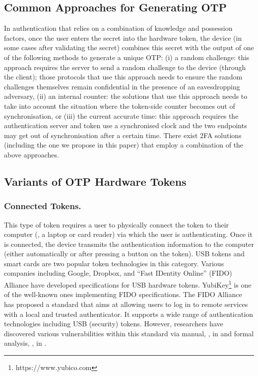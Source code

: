 \subsection{Common Approaches for Generating OTP}

In authentication that relies on a combination of knowledge and possession factors, once the user enters the secret into the hardware token, the device (in some cases after validating the secret) combines this secret with the output of one of the following methods to generate a unique OTP:  (i) a random challenge: this approach requires the server to send a random challenge to the device (through the client); those protocols that use this approach needs to ensure the random challenges themselves remain confidential in the presence of an eavesdropping adversary,  (ii) an internal counter:  the solutions that use this approach needs to take into account the situation where the token-side counter becomes out of synchronisation, or (iii) the current accurate time: this approach requires the authentication server and token use a synchronised clock and the two endpoints may get out of synchronisation after a certain time. There exist 2FA solutions (including the one we propose in this paper) that employ a combination of the above approaches. 
\subsection{Variants of OTP Hardware Tokens}

\subsubsection{Connected Tokens.}
This type of token requires a user to physically connect the token to their computer (\eg, a laptop or card reader) via which the user is authenticating. Once it is connected, the device transmits the authentication information to the computer (either automatically or after pressing a button on the token). USB tokens and smart cards are two popular token technologies in this category.  Various companies including Google, Dropbox, and  ``Fast IDentity Online'' (FIDO) Alliance have developed specifications for USB hardware tokens. YubiKey\footnote{https://www.yubico.com} is one of the well-known ones implementing FIDO specifications. The FIDO  Alliance has proposed a standard that aims at allowing users to log in to remote services with a local and trusted authenticator. It supports a wide range of authentication technologies including USB (security) tokens. However, researchers have discovered various vulnerabilities within this standard via manual, \eg, in \cite{PanosMNPX17,ChangMSS17,LoutfiJ15} and formal analysis, \eg, in \cite{ndss/FengLP021}. 

